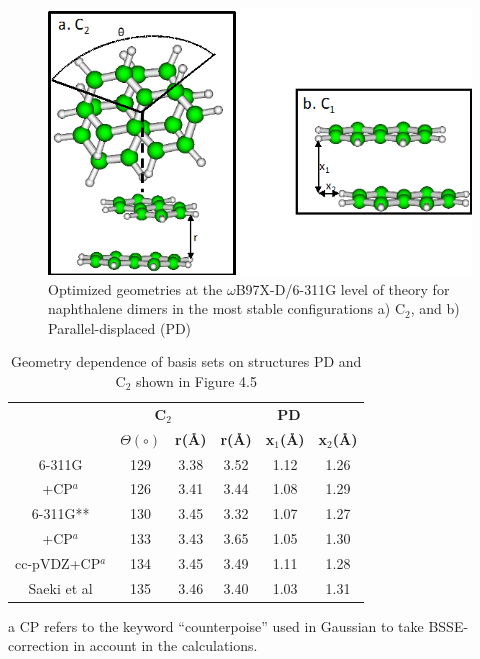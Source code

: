 \begin{figure}[h]
	\centering
	\includegraphics[scale=0.5]{image/napthalene-dimer}     
	\caption[Optimized geometries for naphthalene dimers]{Optimized geometries at the $\omega$B97X-D/6-311G level of theory for naphthalene dimers in the most stable configurations a) C$_{2}$, and b) Parallel-displaced (PD)}  \label{fig5d}
\end{figure}


\begin{table}[H]
	\caption{Geometry dependence of basis sets on structures PD and C$_{2}$ shown in Figure 4.5}
	\begin{center}
		\begin{threeparttable}[b]
		\begin{tabular}{c c c c c c}
			\toprule
			 & \multicolumn{2}{p{4cm}}{\centering \textbf{C$_{2}$}} & \multicolumn{3}{p{6cm}}{\centering \textbf{PD}}\\
			  & \textbf{$\Theta(\circ)$} & \textbf{r(\AA)} & \textbf{r(\AA)} & \textbf{x$_{1}$(\AA)} & \textbf{x$_{2}$(\AA)}\\
			  \midrule
			  6-311G & 129 & 3.38 & 3.52 & 1.12 & 1.26\\
			  +CP$^{a}$ & 126  & 3.41 & 3.44 & 1.08 & 1.29\\	  
			  6-311G** & 130 & 3.45 & 3.32 & 1.07 & 1.27\\
			  +CP$^{a}$ & 133 & 3.43 & 3.65 & 1.05 & 1.30\\
			  cc-pVDZ+CP$^{a}$ & 134 & 3.45 & 3.49 & 1.11 & 1.28\\
			  Saeki et al\cite{saeki2006theoretical} & 135 & 3.46 & 3.40 & 1.03 &  1.31\\
			  \bottomrule
		\end{tabular}
		
		\begin{tablenotes}
			\item[a] CP refers to the keyword “counterpoise” used in Gaussian to take BSSE-correction in account in the calculations.
		\end{tablenotes}
	\end{threeparttable}
	\end{center}
	\label{table5}
\end{table}


